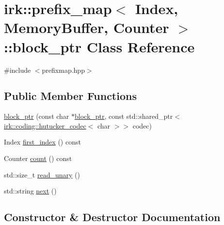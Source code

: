 \hypertarget{classirk_1_1prefix__map_1_1block__ptr}{}\section{irk\+:\+:prefix\+\_\+map$<$ Index, Memory\+Buffer, Counter $>$\+:\+:block\+\_\+ptr Class Reference}
\label{classirk_1_1prefix__map_1_1block__ptr}


{\ttfamily \#include $<$prefixmap.\+hpp$>$}

\subsection*{Public Member Functions}
\begin{DoxyCompactItemize}
\item 
\mbox{\hyperlink{classirk_1_1prefix__map_1_1block__ptr_a6834a182e0398c957a02a7157b93b590}{block\+\_\+ptr}} (const char $\ast$\mbox{\hyperlink{classirk_1_1prefix__map_1_1block__ptr}{block\+\_\+ptr}}, const std\+::shared\+\_\+ptr$<$ \mbox{\hyperlink{classirk_1_1coding_1_1hutucker__codec}{irk\+::coding\+::hutucker\+\_\+codec}}$<$ char $>$$>$ codec)
\item 
Index \mbox{\hyperlink{classirk_1_1prefix__map_1_1block__ptr_a501892be0f2a245b8982045c3d3febc1}{first\+\_\+index}} () const
\item 
Counter \mbox{\hyperlink{classirk_1_1prefix__map_1_1block__ptr_a98fc3e949cae9309b0b621bfa1854c70}{count}} () const
\item 
std\+::size\+\_\+t \mbox{\hyperlink{classirk_1_1prefix__map_1_1block__ptr_afe1fc5491585abf3d5e03174fc9399b9}{read\+\_\+unary}} ()
\item 
std\+::string \mbox{\hyperlink{classirk_1_1prefix__map_1_1block__ptr_a8dcec33c10dd801c885773b4a2eda2c2}{next}} ()
\end{DoxyCompactItemize}


\subsection{Constructor \& Destructor Documentation}
\mbox{\label{classirk_1_1prefix__map_1_1block__ptr_a6834a182e0398c957a02a7157b93b590}} 
